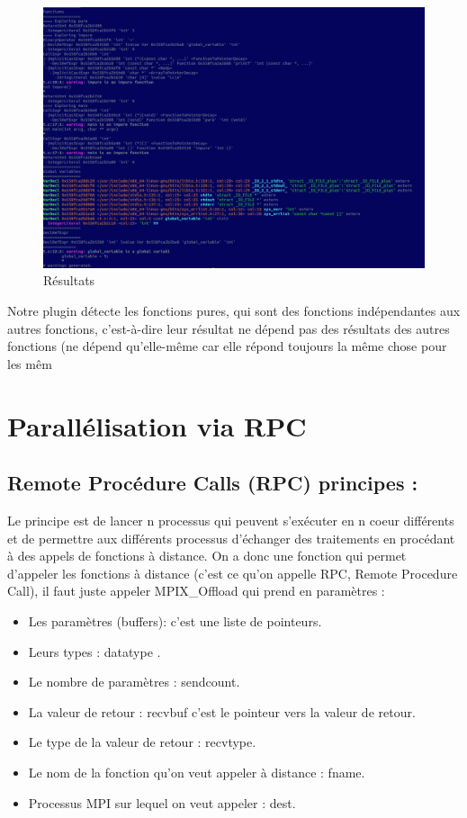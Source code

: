 \documentclass[12pt,a4paper]{article}
\begin{document}
\begin{figure}[H]
\centering
\includegraphics[scale=0.35]{AST.jpg}
\caption[Résultats]{Résultats} 
\end{figure}

Notre plugin détecte les fonctions pures, qui sont des fonctions indépendantes aux autres fonctions, c'est-à-dire leur résultat ne dépend pas des résultats des autres fonctions (ne dépend qu'elle-même car elle répond toujours la même chose pour les mêm
\section{Parallélisation via RPC }

\subsection{Remote Procédure Calls (RPC) principes :}
Le principe est de lancer n processus qui peuvent s'exécuter en n coeur différents et de permettre aux différents processus d'échanger des traitements en procédant à des appels de fonctions à distance. On a donc une fonction qui permet d'appeler les fonctions à distance (c'est ce qu'on appelle RPC, Remote Procedure Call), il faut juste appeler MPIX\_Offload qui prend en paramètres :

\begin{itemize}
\item Les paramètres (buffers): c'est une liste de pointeurs.
\item Leurs types : datatype .
\item Le nombre de paramètres : sendcount. 
\item La valeur de retour : recvbuf c'est le pointeur vers la valeur de retour.
\item Le type de la valeur de retour : recvtype.
\item Le nom de la fonction qu'on veut appeler à distance : fname.
\item Processus MPI sur lequel on veut appeler : dest.
\end{itemize}
\end{document}
